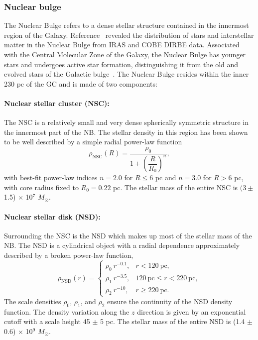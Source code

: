 \documentclass[doublespace,nopageskip]{VTthesis} %
\begin{document}
\subsubsection{Nuclear bulge}\label{sec:nb}

The Nuclear Bulge refers to a dense stellar structure contained in the innermost region of the Galaxy. 
Reference~\cite{2002A&A...384..112L} revealed the distribution of stars and interstellar matter in the Nuclear Bulge from IRAS and COBE DIRBE data. Associated with the Central Molecular Zone of the Galaxy, the Nuclear Bulge has younger stars and undergoes active star formation, distinguishing it from the old and evolved stars of the Galactic bulge~\cite{2002A&A...384..112L}. 
The Nuclear Bulge resides within the inner 230 pc of the GC and is made of two components:

\paragraph{Nuclear stellar cluster (NSC):} The NSC is a relatively small and very dense spherically symmetric structure in the innermost part of the NB. The stellar density in this region has been shown~\cite{Launhardt:2002tx} to be well described by a simple radial power-law function
\begin{equation}\label{eq:NSC}
  \rho_{\text{NSC}}(R)=\dfrac{\rho_0}{1+\left(\dfrac{R}{R_0}\right)^{n}},
\end{equation}
with best-fit power-law indices $n = 2.0$ for $R \leq 6$ pc and $n = 3.0$ for $R > 6$ pc, with core radius fixed to $R_0 = 0.22$ pc. The stellar mass of the entire NSC is $(3\pm$ 1.5) $\times$ 10$^7$ $M_\odot$.

\paragraph{Nuclear stellar disk (NSD):} Surrounding the NSC is the NSD which makes up most of the stellar mass of the NB. The NSD is a cylindrical object with a radial dependence approximately described by a broken power-law function,
\begin{equation}\label{eq:rhonsd}
  \rho_{\text{NSD}}(r) = \begin{cases}
    \rho_0\ r^{-0.1}, & r < 120\ \text{pc},\\
    \rho_1\ r^{-3.5}, & 120\ \text{pc} \leq r < 220\ \text{pc},\\
    \rho_2\ r^{-10}, & r \geq 220\ \text{pc}.
  \end{cases}
\end{equation}
The scale densities $\rho_0$, $\rho_1$, and $\rho_2$ ensure the continuity of the NSD density function. The density variation along the $z$ direction is given by an exponential cutoff with a scale height 45 $\pm$ 5 pc. The stellar mass of the entire NSD is (1.4 $\pm$ 0.6) $\times$ 10$^9$ $M_\odot$.
\end{document}
